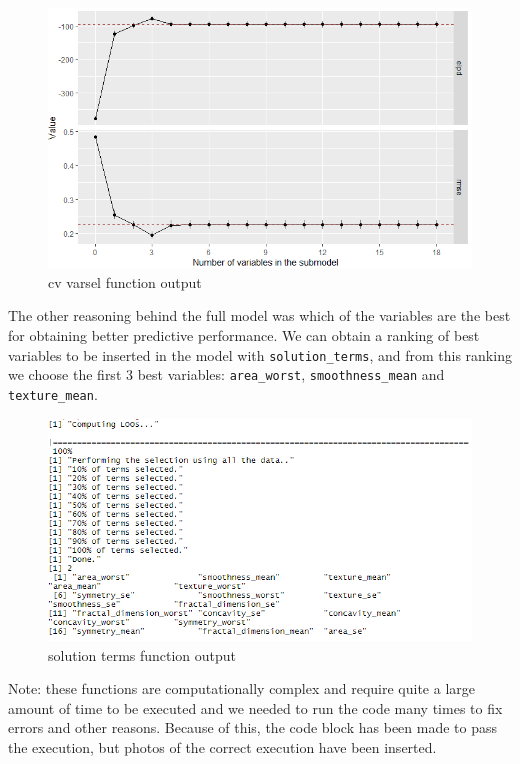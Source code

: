 \documentclass[
]{article}
\begin{document}
\begin{figure}[H]

{\centering \includegraphics[width=0.8\linewidth]{images/cv_varsel} 

}

\caption{cv varsel function output}\label{fig:unnamed-chunk-18}
\end{figure}

The other reasoning behind the full model was which of the variables are
the best for obtaining better predictive performance. We can obtain a
ranking of best variables to be inserted in the model with
\texttt{solution\_terms}, and from this ranking we choose the first 3
best variables: \texttt{area\_worst}, \texttt{smoothness\_mean} and
\texttt{texture\_mean}.

\begin{figure}[H]

{\centering \includegraphics[width=0.8\linewidth]{images/solution_terms} 

}

\caption{solution terms function output}\label{fig:unnamed-chunk-19}
\end{figure}

Note: these functions are computationally complex and require quite a
large amount of time to be executed and we needed to run the code many
times to fix errors and other reasons. Because of this, the code block
has been made to pass the execution, but photos of the correct execution
have been inserted.
\end{document}
